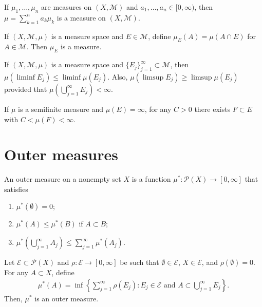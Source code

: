 \begin{proposition}
    If $\mu_1, \dots, \mu_n$ are measures on $(X, \mathcal{M})$ and $a_1, \dots, a_n \in [0, \infty)$, then $\mu = \sum_{k=1}^{n} a_k \mu_k$ is a measure on $(X, \mathcal{M})$.
\end{proposition}

\begin{proposition}
    If $(X, \mathcal{M}, \mu)$ is a measure space and $E \in \mathcal{M}$, define $\mu_E(A) = \mu(A \cap E)$ for $A \in \mathcal{M}$.
    Then $\mu_E$ is a measure.
\end{proposition}

\begin{proposition}
    If $(X, \mathcal{M}, \mu)$ is a measure space and $\{ E_j \}_{j=1}^{\infty} \subset \mathcal{M}$, then $\mu(\liminf E_j) \le \liminf \mu(E_j)$.
    Also, $\mu(\limsup E_j) \ge \limsup \mu(E_j)$ provided that $\mu(\bigcup_{j=1}^{\infty} E_j) < \infty$.
\end{proposition}

\begin{proposition}
    If $\mu$ is a semifinite measure and $\mu(E) = \infty$, for any $C > 0$ there exists $F \subset E$ with $C < \mu(F) < \infty$.
\end{proposition}

\section{Outer measures}

\begin{definition}
    An outer measure on a nonempty set $X$ is a function $\mu^*: \mathcal{P}(X) \to [0, \infty]$ that satisfies
    \begin{enumerate}
        \item $\mu^*(\emptyset) = 0$;
        \item $\mu^*(A) \le \mu^*(B)$ if $A \subset B$;
        \item $\mu^*(\bigcup_{j=1}^{\infty} A_j) \le \sum_{j=1}^{\infty} \mu^*(A_j)$.
    \end{enumerate}
\end{definition}

\begin{proposition}
    Let $\mathcal{E} \subset \mathcal{P}(X)$ and $\rho : \mathcal{E} \to [0, \infty]$ be such that $\emptyset \in \mathcal{E}$, $X \in \mathcal{E}$, and $\rho(\emptyset) = 0$.
    For any $A \subset X$, define
    \begin{align}
        \mu^*(A) = \inf \left\{ \sum_{j=1}^{\infty} \rho(E_j): E_j \in \mathcal{E} \text{ and } A \subset \bigcup _{j=1}^{\infty} E_j \right\}.
    \end{align}
    Then, $\mu^*$ is an outer measure.
\end{proposition}

